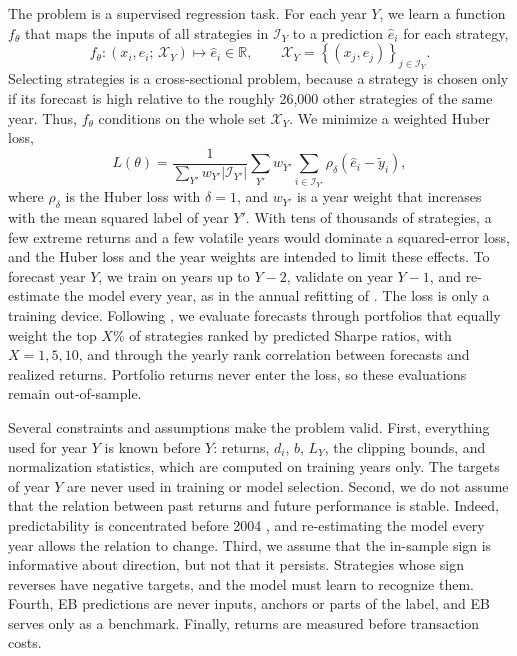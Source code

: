 \documentclass[pdflatex,sn-mathphys-num]{sn-jnl}%
\theoremstyle{thmstyleone}%
\theoremstyle{thmstyletwo}%
\theoremstyle{thmstylethree}%
\begin{document}
The problem is a supervised regression task. For each year $Y$, we learn a function $f_{\theta}$ that maps the inputs of all strategies in $\mathcal{I}_Y$ to a prediction $\hat{e}_i$ for each strategy,
\[
f_{\theta}: \left(x_i, e_i;\, \mathcal{X}_Y\right) \mapsto \hat{e}_i \in \mathbb{R},
\qquad
\mathcal{X}_Y = \left\{(x_j, e_j)\right\}_{j \in \mathcal{I}_Y}.
\]
Selecting strategies is a cross-sectional problem, because a strategy is chosen only if its forecast is high relative to the roughly 26,000 other strategies of the same year. Thus, $f_{\theta}$ conditions on the whole set $\mathcal{X}_Y$. We minimize a weighted Huber loss,
\begin{equation}
L(\theta) = \frac{1}{\sum_{Y'} w_{Y'} |\mathcal{I}_{Y'}|}\sum_{Y'} w_{Y'} \sum_{i \in \mathcal{I}_{Y'}} \rho_{\delta}\!\left(\hat{e}_i - \tilde{y}_i\right),
\label{eq:train_loss}
\end{equation}
where $\rho_\delta$ is the Huber loss with $\delta = 1$, and $w_{Y'}$ is a year weight that increases with the mean squared label of year $Y'$. With tens of thousands of strategies, a few extreme returns and a few volatile years would dominate a squared-error loss, and the Huber loss and the year weights are intended to limit these effects. To forecast year $Y$, we train on years up to $Y-2$, validate on year $Y-1$, and re-estimate the model every year, as in the annual refitting of \cite{gu2020empirical}. The loss is only a training device. Following \cite{chen2025highthroughputassetpricing}, we evaluate forecasts through portfolios that equally weight the top $X\%$ of strategies ranked by predicted Sharpe ratios, with $X = 1, 5, 10$, and through the yearly rank correlation between forecasts and realized returns. Portfolio returns never enter the loss, so these evaluations remain out-of-sample.

Several constraints and assumptions make the problem valid. First, everything used for year $Y$ is known before $Y$: returns, $d_i$, $b$, $L_Y$, the clipping bounds, and normalization statistics, which are computed on training years only. The targets of year $Y$ are never used in training or model selection. Second, we do not assume that the relation between past returns and future performance is stable. Indeed, predictability is concentrated before 2004 \cite{chen2025highthroughputassetpricing}, and re-estimating the model every year allows the relation to change. Third, we assume that the in-sample sign is informative about direction, but not that it persists. Strategies whose sign reverses have negative targets, and the model must learn to recognize them. Fourth, EB predictions are never inputs, anchors or parts of the label, and EB serves only as a benchmark. Finally, returns are measured before transaction costs.
\end{document}
